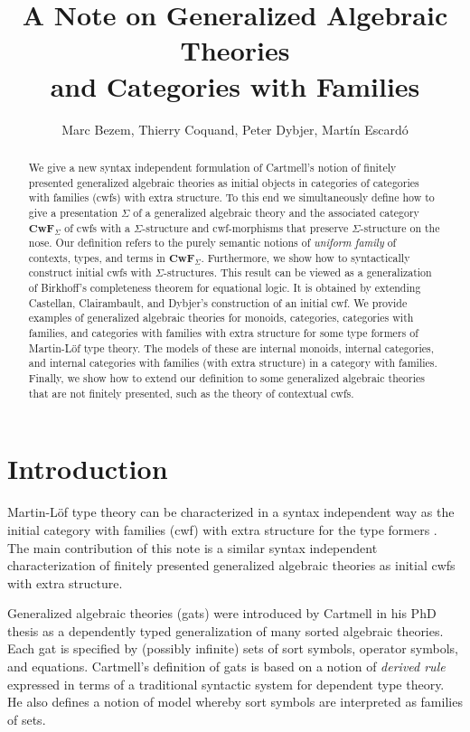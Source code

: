 \documentclass{lmcs}
\title[Generalized Algebraic Theories and Categories with Families]{A Note on Generalized Algebraic Theories\\and Categories with Families}\author{Marc Bezem, Thierry Coquand, Peter Dybjer, Mart\'in Escard\'o}
\newcommand{\FYI}[1]{{\color{red}#1}}
\def\Cwf{\mathbf{CwF}}
\begin{document}
\maketitle

\begin{abstract}
We give a new syntax independent formulation of Cartmell's notion of finitely presented generalized algebraic theories as initial objects in categories of categories with families (cwfs) with extra structure.
To this end we simultaneously define how to \FYI{give a presentation} $\Sigma$ of a generalized algebraic theory and the associated category $\Cwf_\Sigma$ of cwfs with a $\Sigma$-structure and cwf-morphisms that preserve $\Sigma$-structure on the nose.  Our definition refers to the purely semantic notions of {\em uniform family} of contexts, types, and terms in $\Cwf_\Sigma$. Furthermore, we show how to syntactically construct initial cwfs with $\Sigma$-structures. This result can be viewed as a generalization of Birkhoff's completeness theorem for equational logic. It is obtained by extending Castellan, Clairambault, and Dybjer's construction of an initial cwf. We provide examples of generalized algebraic theories for monoids, categories, categories with families, and categories with families with extra structure for some type formers of Martin-Löf type theory. The models of these are internal monoids, internal categories, and internal categories with families (with extra structure) in a category with families. Finally, we show how to extend our definition to some generalized algebraic theories that are not finitely presented, such as the theory of contextual cwfs.
\end{abstract}

\section{Introduction}

Martin-Löf type theory can be characterized in a syntax independent way as the initial category with families (cwf)  with extra structure for the type formers \cite{castellan:tlca2015,castellan:lmcs}. The main contribution of this note is a similar syntax independent characterization of finitely presented generalized algebraic theories as initial cwfs with extra structure.

Generalized algebraic theories (gats) were introduced by Cartmell in his PhD thesis \cite{cartmell:phd} as a dependently typed generalization of many sorted algebraic theories. Each gat is specified by \FYI{ (possibly infinite) sets of sort symbols, operator symbols, and equations}. Cartmell's definition of gats \cite{cartmell:phd,cartmell:apal} is based on a notion of {\em derived rule} expressed in terms of a traditional syntactic system for dependent type theory. He also defines a notion of model whereby sort symbols are interpreted as families of sets.
\end{document}
